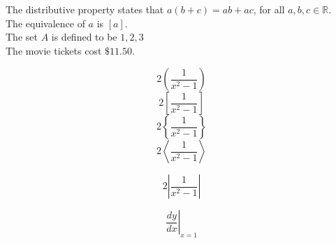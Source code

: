 \documentclass[11pt]{article}
\begin{document}
The distributive property states that $a(b+c) = ab + ac$, for all $a,b,c \in \mathbb{R}$. \\ [6pt]
The equivalence of $a$ is $[a]$. \\ [6pt]
The set $A$ is defined to be ${1, 2, 3}$ \\ [6pt]
The movie tickets cost $\$11.50$.

$$2\left(\frac{1}{{x^2}-1}\right)$$
$$2\left[\frac{1}{{x^2}-1}\right]$$
$$2\left\{\frac{1}{{x^2}-1}\right\}$$
$$2\left    \langle  \frac{1}{{x^2}-1}\right  \rangle     $$

$$2\left   |  \frac{1}{{x^2}-1}\right  |     $$

$$ \left. \frac{dy}{dx} \right| _{x=1}   $$
\end{document}
